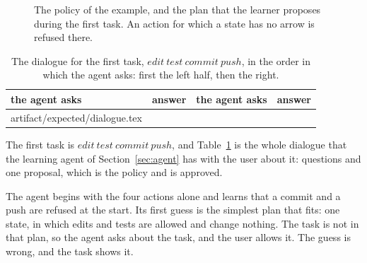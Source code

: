 \documentclass[acmsmall,nonacm,screen]{acmart}
\makeatletter
\newcommand{\nm}[1]{\mathit{#1}}
\newcommand{\edit}{\nm{edit}}
\newcommand{\test}{\nm{test}}
\newcommand{\commit}{\nm{commit}}
\newcommand{\push}{\nm{push}}
\newcommand{\claim}[2]{#2}
\newcommand{\rows}[1]{\@@input artifact/expected/#1.tex }
\makeatother
\begin{document}
\begin{figure}
\centering
{}
\caption{The policy of the example, and the plan that the learner proposes during the first
task. An action for which a state has no arrow is refused there.}
\label{fig:plan}
\end{figure}

\begin{table}
\caption{The dialogue for the first task, $\edit\ \test\ \commit\ \push$, in the order in
which the agent asks: first the left half, then the right.}
\label{tab:dialogue}
\small
\begin{tabular}{llll}
\toprule
the agent asks & answer & the agent asks & answer \\
\midrule
\rows{dialogue}
\bottomrule
\end{tabular}
\end{table}

\claim{example}{The first task is $\edit\ \test\ \commit\ \push$, and
Table~\ref{tab:dialogue} is the whole dialogue that the learning agent of
Section~\ref{sec:agent} has with the user about it: \exDialogueAsked{} questions and one
proposal, which is the policy and is approved.}

The agent begins with the four actions alone and learns that a commit and a push are refused
at the start. Its first guess is the simplest plan that fits: one state, in which edits and
tests are allowed and change nothing. The task is not in that plan, so the agent asks about
the task, and the user allows it. The guess is wrong, and the task shows it.
\end{document}
